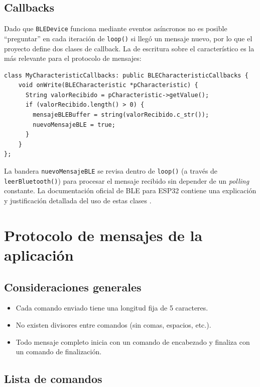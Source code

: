 \documentclass[12pt,a4paper]{article}
\begin{document}
\subsection{Callbacks}

Dado que \texttt{BLEDevice} funciona mediante eventos asíncronos no es posible ``preguntar'' en cada iteración de \texttt{loop()} si llegó un mensaje nuevo, por lo que el proyecto define dos clases de callback. La de escritura sobre el característico es la más relevante para el protocolo de mensajes:

\begin{lstlisting}[caption={Callback de escritura sobre el característico}, label={lst:callback-write}]
class MyCharacteristicCallbacks: public BLECharacteristicCallbacks {
    void onWrite(BLECharacteristic *pCharacteristic) {
      String valorRecibido = pCharacteristic->getValue();
      if (valorRecibido.length() > 0) {
        mensajeBLEBuffer = string(valorRecibido.c_str());
        nuevoMensajeBLE = true;
      }
    }
};
\end{lstlisting}

La bandera \texttt{nuevoMensajeBLE} se revisa dentro de \texttt{loop()} (a través de \texttt{leerBluetooth()}) para procesar el mensaje recibido sin depender de un  \textit{polling} constante. La documentación oficial de BLE para ESP32 contiene una explicación y justificación detallada del uso de estas clases \cite{kolban_ble}.

\section{Protocolo de mensajes de la aplicación}
\label{sec:protocolo}


\subsection{Consideraciones generales}
\begin{itemize}
    \item Cada comando enviado tiene una longitud fija de 5 caracteres.
    \item No existen divisores entre comandos (sin comas, espacios, etc.).
    \item Todo mensaje completo inicia con un comando de encabezado y finaliza con un comando de finalización.
\end{itemize}

\subsection{Lista de comandos}
\end{document}

